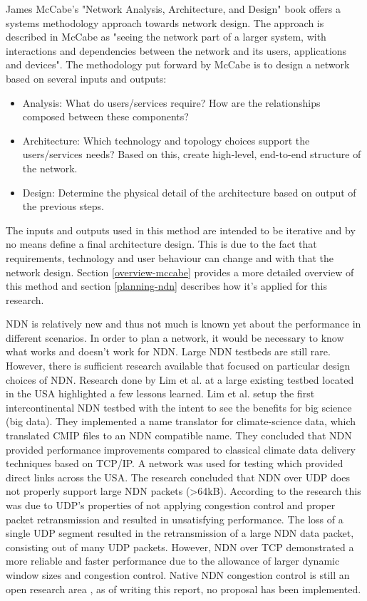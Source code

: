 James McCabe's "Network Analysis, Architecture, and Design" \cite{mccabe2010network} book offers a systems methodology approach towards network design. The approach is described in McCabe as "seeing the network part of a larger system, with interactions and dependencies between the network and its users, applications and devices". The methodology put forward by McCabe is to design a network based on several inputs and outputs:
\begin{itemize}
    \item Analysis: What do users/services require? How are the relationships composed between these components?
    \item Architecture: Which technology and topology choices support the users/services needs? Based on this, create high-level, end-to-end structure of the network.
    \item Design: Determine the physical detail of the architecture based on output of the previous steps.
\end{itemize}

The inputs and outputs used in this method are intended to be iterative and by no means define a final architecture design. This is due to the fact that requirements, technology and user behaviour can change and with that the network design. Section \ref{overview-mccabe} provides a more detailed overview of this method and section \ref{planning-ndn} describes how it's applied for this research.

NDN is relatively new and thus not much is known yet about the performance in different scenarios. In order to plan a network, it would be necessary to know what works and doesn't work for NDN. Large NDN testbeds are still rare. However, there is sufficient research available that focused on particular design choices of NDN. Research done by Lim et al. \cite{lim2018ndn} at a large existing testbed located in the USA \cite{ndn-testbed-status} highlighted a few lessons learned. Lim et al. setup the first intercontinental NDN testbed with the intent to see the benefits for big science (big data). They implemented a name translator for climate-science data, which translated CMIP files to an NDN compatible name. They concluded that NDN provided performance improvements compared to classical climate data delivery techniques based on TCP/IP. A network was used for testing which provided direct links across the USA. The research concluded that NDN over UDP does not properly support large NDN packets (\textgreater 64kB). According to the research this was due to UDP's properties of not applying congestion control and proper packet retransmission and resulted in unsatisfying performance. The loss of a single UDP segment resulted in the retransmission of a large NDN data packet, consisting out of many UDP packets. However, NDN over TCP demonstrated a more reliable and faster performance due to the allowance of larger dynamic window sizes and congestion control. Native NDN congestion control is still an open research area \cite{ren2016congestion}, as of writing this report, no proposal has been implemented.

